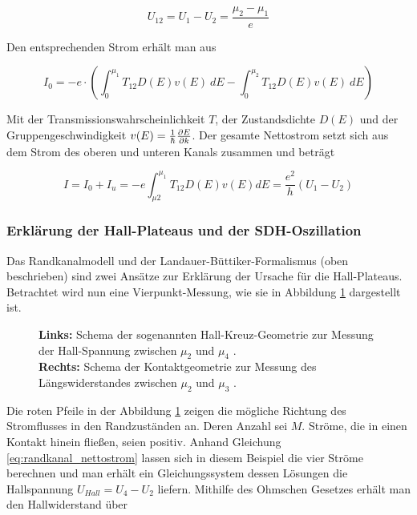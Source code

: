 \begin{equation}
U_{12}=U_1 - U_2= \frac{\mu_2-\mu_1}{e}
\label{eq:spannung_randkanal}
\end{equation}

Den entsprechenden Strom erhält man aus 

\begin{equation}
I_0=-e \cdot \left( \int^{\mu_1}_0T_{12}D(E)v(E)~dE-\int^{\mu_2}_0T_{12}D(E)v(E)~dE \right)
\label{eq:strom_randkanal}
\end{equation}

Mit der Transmissionswahrscheinlichkeit $T$, der Zustandsdichte $D(E)$
und der Gruppengeschwindigkeit $v(E)=\frac{1}{\hbar}\frac{\partial E}{\partial k}$.
Der gesamte Nettostrom setzt sich aus dem Strom des oberen und unteren Kanals zusammen und beträgt

\begin{equation}
I=I_0+I_u=-e\int^{\mu_1}_{\mu2}T_{12}D(E)v(E)dE=\frac{e^2}{h}(U_1-U_2)
\label{eq:randkanal_nettostrom}
\end{equation}
 

\subsubsection{Erklärung der Hall-Plateaus und der SDH-Oszillation}

Das Randkanalmodell und der Landauer-Büttiker-Formalismus (oben beschrieben) sind zwei Ansätze zur Erklärung der Ursache für die Hall-Plateaus.
Betrachtet wird nun eine Vierpunkt-Messung, wie sie in Abbildung \ref{fig:Vierpunktmessung_Anleitungsheft} dargestellt ist. 

\begin{figure}[h]
\centering
	\caption[Vierpunkt-Messung]{
		\textbf{Links:} Schema der sogenannten Hall-Kreuz-Geometrie zur Messung der Hall-Spannung zwischen $\mu_2$ und $\mu_4$ \cite{anleitung}.\\
		\textbf{Rechts:} Schema der Kontaktgeometrie zur Messung des Längswiderstandes zwischen $\mu_2$ und $\mu_3$ \cite{anleitung}.
	}
	\label{fig:Vierpunktmessung_Anleitungsheft}
\end{figure}

Die roten Pfeile in der Abbildung \ref{fig:Vierpunktmessung_Anleitungsheft} zeigen die mögliche Richtung des Stromflusses in den Randzuständen an. Deren Anzahl sei $M$. Ströme, die in einen Kontakt hinein fließen, seien positiv. 
Anhand Gleichung \ref{eq:randkanal_nettostrom} lassen sich in diesem Beispiel die vier Ströme berechnen und man erhält ein Gleichungssystem dessen Lösungen die Hallspannung $U_{Hall}=U_4-U_2$ liefern. 
Mithilfe des Ohmschen Gesetzes erhält man den Hallwiderstand über

